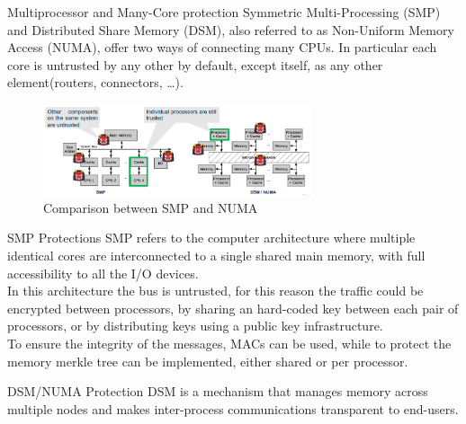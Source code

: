 \begin{section}{Multiprocessor and Many-Core protection}
  Symmetric Multi-Processing (SMP) and Distributed Share Memory (DSM), also referred to as
  Non-Uniform Memory Access (NUMA), offer two ways of connecting many CPUs. In particular each core
  is untrusted by any other by default, except itself, as any other element(routers, connectors,
  \dots).

  \begin{figure}[H]
    \centering
    \includegraphics[width=0.7\textwidth]{img/hardware/smp and dsm.png}
    \caption{Comparison between SMP and NUMA}
  \end{figure}

  \begin{subsection}{SMP Protections}
    SMP refers to the computer architecture where multiple identical cores are interconnected
    to a single shared main memory, with full accessibility to all the I/O devices.\\
    In this architecture the bus is untrusted, for this reason the traffic could be encrypted
    between processors, by sharing an hard-coded key between each pair of processors, or by
    distributing keys using a public key infrastructure.\\
    To ensure the integrity of the messages, MACs can be used, while to protect the memory merkle
    tree can be implemented, either shared or per processor.
  \end{subsection}

  \begin{subsection}{DSM/NUMA Protection}
    DSM is a mechanism that manages memory across multiple nodes and makes inter-process
    communications transparent to end-users.


\end{subsection}
\end{section}

